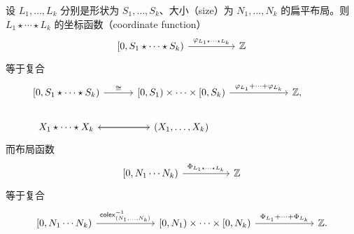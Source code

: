 \begin{proposition}\label{layoutfunctionofconcatenatedlayout}
    设 $L_1,\dots,L_k$ 分别是形状为 $S_1,\dots,S_k$、大小（size）为 $N_1,\dots,N_k$ 的扁平布局。则 $L_1 \star \cdots \star L_k$ 的坐标函数（coordinate function）
        \[ \begin{tikzcd}
        {[}0,S_1 \star \cdots \star S_k{)} \ar[rr,"\varphi_{L_1 \star \cdots \star  L_k} "] & & \mathbb{Z}
        \end{tikzcd}
        \]
        等于复合
        \[\begin{tikzcd} [column sep = 30]
     {[}0,S_1 \star \cdots \star S_k{)} \ar[r,"\cong"]  & {[}0,S_1{)} \times \cdots \times {[}0,S_k{)} \ar[rr,"\varphi_{L_1} +\cdots + \varphi_{L_k}"] & & \mathbb{Z} , \\
     X_1 \star \cdots \star X_k \ar[r]  & \ar[l] (X_1,\dots,X_k) & & &
    \end{tikzcd} \]
        而布局函数
    \[ \begin{tikzcd}
     {[}0,N_1 \cdots N_k{)} \ar[rr,"\Phi_{L_1 \star \cdots \star  L_k} "] & & \mathbb{Z}
    \end{tikzcd}
    \]
    等于复合
    \[\begin{tikzcd} [column sep = 30]
    {[}0,N_1\cdots N_k{)} \ar[rr,"\colex_{(N_1,\dots,N_k)}^{-1}"] & & {[}0,N_1{)} \times \cdots \times {[}0,N_k{)} \ar[rr,"\Phi_{L_1} + \cdots +\Phi_{L_k}"] & &  \mathbb{Z}.
    \end{tikzcd} \]
\end{proposition}

